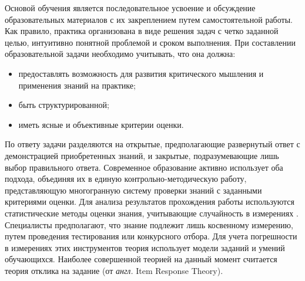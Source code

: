Основой обучения является последовательное усвоение и обсуждение образовательных материалов с их закреплением путем самостоятельной работы.
Как правило, практика организована в виде решения задач с четко заданной целью, интуитивно понятной проблемой
и сроком выполнения. При составлении образовательной задачи необходимо учитывать, что она должна:
\begin{itemize}
    \item предоставлять возможность для развития критического мышления и применения знаний на практике;
    \item быть структурированной;
    \item иметь ясные и объективные критерии оценки.
\end{itemize}
По ответу задачи разделяются на открытые, предполагающие развернутый ответ с демонстрацией приобретенных знаний, 
и закрытые, подразумевающие лишь выбор правильного ответа. Современное образование активно использует оба подхода, 
объединяя их в единую контрольно-методическую работу, представляющую многогранную систему проверки знаний с заданными
критериями оценки. Для анализа результатов прохождения работы используются статистические методы оценки знания, учитывающие случайность в измерениях 
\cite{brennan2006educational}. Специалисты предполагают, что знание подлежит лишь косвенному измерению, путем проведения тестирования или 
конкурсного отбора. Для учета погрешности в измерениях этих инструментов теория использует модели заданий и умений обучающихся.
Наиболее совершенной теорией на данный момент считается теория отклика на задание (от \textit{англ.} Item Response Theory).
